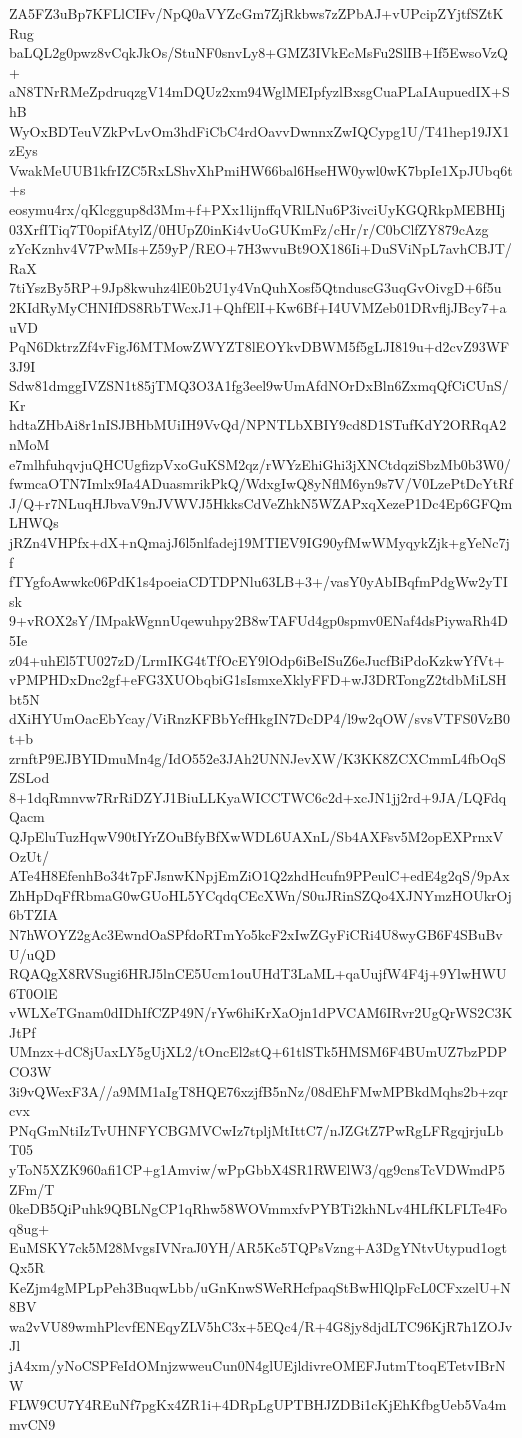 ZA5FZ3uBp7KFLlCIFv/NpQ0aVYZcGm7ZjRkbws7zZPbAJ+vUPcipZYjtfSZtKRug
baLQL2g0pwz8vCqkJkOs/StuNF0snvLy8+GMZ3IVkEcMsFu2SlIB+If5EwsoVzQ+
aN8TNrRMeZpdruqzgV14mDQUz2xm94WglMEIpfyzlBxsgCuaPLaIAupuedIX+ShB
WyOxBDTeuVZkPvLvOm3hdFiCbC4rdOavvDwnnxZwIQCypg1U/T41hep19JX1zEys
VwakMeUUB1kfrIZC5RxLShvXhPmiHW66bal6HseHW0ywl0wK7bpIe1XpJUbq6t+s
eosymu4rx/qKlcggup8d3Mm+f+PXx1lijnffqVRlLNu6P3ivciUyKGQRkpMEBHIj
03XrfITiq7T0opifAtylZ/0HUpZ0inKi4vUoGUKmFz/cHr/r/C0bClfZY879cAzg
zYcKznhv4V7PwMIs+Z59yP/REO+7H3wvuBt9OX186Ii+DuSViNpL7avhCBJT/RaX
7tiYszBy5RP+9Jp8kwuhz4lE0b2U1y4VnQuhXosf5QtnduscG3uqGvOivgD+6f5u
2KIdRyMyCHNIfDS8RbTWcxJ1+QhfElI+Kw6Bf+I4UVMZeb01DRvfljJBcy7+auVD
PqN6DktrzZf4vFigJ6MTMowZWYZT8lEOYkvDBWM5f5gLJI819u+d2cvZ93WF3J9I
Sdw81dmggIVZSN1t85jTMQ3O3A1fg3eel9wUmAfdNOrDxBln6ZxmqQfCiCUnS/Kr
hdtaZHbAi8r1nISJBHbMUiIH9VvQd/NPNTLbXBIY9cd8D1STufKdY2ORRqA2nMoM
e7mlhfuhqvjuQHCUgfizpVxoGuKSM2qz/rWYzEhiGhi3jXNCtdqziSbzMb0b3W0/
fwmcaOTN7Imlx9Ia4ADuasmrikPkQ/WdxgIwQ8yNflM6yn9s7V/V0LzePtDcYtRf
J/Q+r7NLuqHJbvaV9nJVWVJ5HkksCdVeZhkN5WZAPxqXezeP1Dc4Ep6GFQmLHWQs
jRZn4VHPfx+dX+nQmajJ6l5nlfadej19MTIEV9IG90yfMwWMyqykZjk+gYeNc7jf
fTYgfoAwwkc06PdK1s4poeiaCDTDPNlu63LB+3+/vasY0yAbIBqfmPdgWw2yTIsk
9+vROX2sY/IMpakWgnnUqewuhpy2B8wTAFUd4gp0spmv0ENaf4dsPiywaRh4D5Ie
z04+uhEl5TU027zD/LrmIKG4tTfOcEY9lOdp6iBeISuZ6eJucfBiPdoKzkwYfVt+
vPMPHDxDnc2gf+eFG3XUObqbiG1sIsmxeXklyFFD+wJ3DRTongZ2tdbMiLSHbt5N
dXiHYUmOacEbYcay/ViRnzKFBbYcfHkgIN7DcDP4/l9w2qOW/svsVTFS0VzB0t+b
zrnftP9EJBYIDmuMn4g/IdO552e3JAh2UNNJevXW/K3KK8ZCXCmmL4fbOqSZSLod
8+1dqRmnvw7RrRiDZYJ1BiuLLKyaWICCTWC6c2d+xcJN1jj2rd+9JA/LQFdqQacm
QJpEluTuzHqwV90tIYrZOuBfyBfXwWDL6UAXnL/Sb4AXFsv5M2opEXPrnxVOzUt/
ATe4H8EfenhBo34t7pFJsnwKNpjEmZiO1Q2zhdHcufn9PPeulC+edE4g2qS/9pAx
ZhHpDqFfRbmaG0wGUoHL5YCqdqCEcXWn/S0uJRinSZQo4XJNYmzHOUkrOj6bTZIA
N7hWOYZ2gAc3EwndOaSPfdoRTmYo5kcF2xIwZGyFiCRi4U8wyGB6F4SBuBvU/uQD
RQAQgX8RVSugi6HRJ5lnCE5Ucm1ouUHdT3LaML+qaUujfW4F4j+9YlwHWU6T0OlE
vWLXeTGnam0dIDhIfCZP49N/rYw6hiKrXaOjn1dPVCAM6IRvr2UgQrWS2C3KJtPf
UMnzx+dC8jUaxLY5gUjXL2/tOncEl2stQ+61tlSTk5HMSM6F4BUmUZ7bzPDPCO3W
3i9vQWexF3A//a9MM1aIgT8HQE76xzjfB5nNz/08dEhFMwMPBkdMqhs2b+zqrcvx
PNqGmNtiIzTvUHNFYCBGMVCwIz7tpljMtIttC7/nJZGtZ7PwRgLFRgqjrjuLbT05
yToN5XZK960afi1CP+g1Amviw/wPpGbbX4SR1RWElW3/qg9cnsTcVDWmdP5ZFm/T
0keDB5QiPuhk9QBLNgCP1qRhw58WOVmmxfvPYBTi2khNLv4HLfKLFLTe4Foq8ug+
EuMSKY7ck5M28MvgsIVNraJ0YH/AR5Kc5TQPsVzng+A3DgYNtvUtypud1ogtQx5R
KeZjm4gMPLpPeh3BuqwLbb/uGnKnwSWeRHcfpaqStBwHlQlpFcL0CFxzelU+N8BV
wa2vVU89wmhPlcvfENEqyZLV5hC3x+5EQc4/R+4G8jy8djdLTC96KjR7h1ZOJvJl
jA4xm/yNoCSPFeIdOMnjzwweuCun0N4glUEjldivreOMEFJutmTtoqETetvIBrNW
FLW9CU7Y4REuNf7pgKx4ZR1i+4DRpLgUPTBHJZDBi1cKjEhKfbgUeb5Va4mmvCN9
